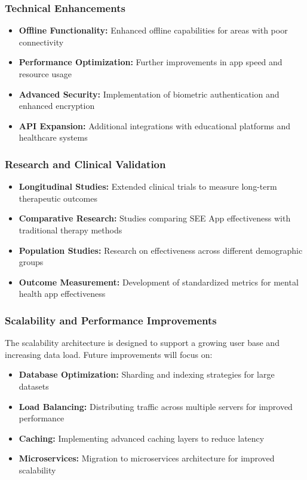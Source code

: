 \documentclass[12pt,a4paper]{article}
\newcommand{\subsectiontitle}[1]{\subsubsection{#1}}
\begin{document}
\subsectiontitle{Technical Enhancements}

\begin{minipage}{\linewidth}
\begin{itemize}
    \item \textbf{Offline Functionality:} Enhanced offline capabilities for areas with poor connectivity
    \item \textbf{Performance Optimization:} Further improvements in app speed and resource usage
    \item \textbf{Advanced Security:} Implementation of biometric authentication and enhanced encryption
    \item \textbf{API Expansion:} Additional integrations with educational platforms and healthcare systems
\end{itemize}
\end{minipage}

\subsectiontitle{Research and Clinical Validation}

\begin{minipage}{\linewidth}
\begin{itemize}
    \item \textbf{Longitudinal Studies:} Extended clinical trials to measure long-term therapeutic outcomes
    \item \textbf{Comparative Research:} Studies comparing SEE App effectiveness with traditional therapy methods
    \item \textbf{Population Studies:} Research on effectiveness across different demographic groups
    \item \textbf{Outcome Measurement:} Development of standardized metrics for mental health app effectiveness
\end{itemize}
\end{minipage}

\subsectiontitle{Scalability and Performance Improvements}

The scalability architecture is designed to support a growing user base and increasing data load. Future improvements will focus on:

\begin{minipage}{\linewidth}
\begin{itemize}
    \item \textbf{Database Optimization:} Sharding and indexing strategies for large datasets
    \item \textbf{Load Balancing:} Distributing traffic across multiple servers for improved performance
    \item \textbf{Caching:} Implementing advanced caching layers to reduce latency
    \item \textbf{Microservices:} Migration to microservices architecture for improved scalability
\end{itemize}
\end{minipage}
\end{document}
